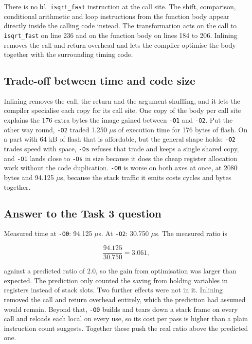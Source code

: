\documentclass[11pt]{article}
\begin{document}
There is no \texttt{bl isqrt\_fast} instruction at the call site. The shift,
comparison, conditional arithmetic and loop instructions from the function body
appear directly inside the calling code instead. The transformation acts on the
call to \texttt{isqrt\_fast} on line 236 and on the function body on lines 184
to 206. Inlining removes the call and return overhead and lets the compiler
optimise the body together with the surrounding timing code.

\subsection{Trade-off between time and code size}

Inlining removes the call, the return and the argument shuffling, and it lets
the compiler specialise each copy for its call site. One copy of
the body per call site explains the 176 extra bytes the image gained between
\texttt{-O1} and \texttt{-O2}. Put the other way round, \texttt{-O2} traded
1.250 $\mu$s of execution time for 176 bytes of flash. On a part with 64 kB of
flash that is affordable, but the general shape holds: \texttt{-O2} trades speed
with space, \texttt{-Os} refuses that trade and keeps a single shared copy, and
\texttt{-O1} lands close to \texttt{-Os} in size because it does the cheap
register allocation work without the code duplication. \texttt{-O0} is worse on
both axes at once, at 2080 bytes and 94.125 $\mu$s, because the stack traffic it
emits costs cycles and bytes together.

\subsection{Answer to the Task 3 question}

Measured time at \texttt{-O0}: 94.125 $\mu$s. At \texttt{-O2}: 30.750 $\mu$s.
The measured ratio is

\[
\frac{94.125}{30.750} = 3.061,
\]

against a predicted ratio of 2.0, so the gain from optimisation was larger than
expected. The prediction only counted the saving from holding variables in
registers instead of stack slots. Two further effects were not in it. Inlining
removed the call and return overhead entirely, which the prediction had assumed
would remain. Beyond that, \texttt{-O0} builds and tears down a stack frame on
every call and reloads each local on every use, so its cost per pass is higher
than a plain instruction count suggests. Together these push the real ratio
above the predicted one.
\end{document}
